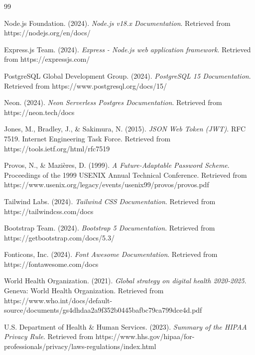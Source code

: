 \renewcommand{\bibname}{References}

\begin{thebibliography}{99}

Node.js Foundation. (2024). \textit{Node.js v18.x Documentation}. Retrieved from https://nodejs.org/en/docs/

Express.js Team. (2024). \textit{Express - Node.js web application framework}. Retrieved from https://expressjs.com/

PostgreSQL Global Development Group. (2024). \textit{PostgreSQL 15 Documentation}. Retrieved from https://www.postgresql.org/docs/15/

Neon. (2024). \textit{Neon Serverless Postgres Documentation}. Retrieved from https://neon.tech/docs

Jones, M., Bradley, J., \& Sakimura, N. (2015). \textit{JSON Web Token (JWT)}. RFC 7519. Internet Engineering Task Force. Retrieved from https://tools.ietf.org/html/rfc7519

Provos, N., \& Mazi{\`e}res, D. (1999). \textit{A Future-Adaptable Password Scheme}. Proceedings of the 1999 USENIX Annual Technical Conference. Retrieved from https://www.usenix.org/legacy/events/usenix99/provos/provos.pdf

Tailwind Labs. (2024). \textit{Tailwind CSS Documentation}. Retrieved from https://tailwindcss.com/docs

Bootstrap Team. (2024). \textit{Bootstrap 5 Documentation}. Retrieved from https://getbootstrap.com/docs/5.3/

Fonticons, Inc. (2024). \textit{Font Awesome Documentation}. Retrieved from https://fontawesome.com/docs

World Health Organization. (2021). \textit{Global strategy on digital health 2020-2025}. Geneva: World Health Organization. Retrieved from https://www.who.int/docs/default-source/documents/gs4dhdaa2a9f352b0445bafbc79ca799dce4d.pdf

U.S. Department of Health \& Human Services. (2023). \textit{Summary of the HIPAA Privacy Rule}. Retrieved from https://www.hhs.gov/hipaa/for-professionals/privacy/laws-regulations/index.html


\end{thebibliography}
